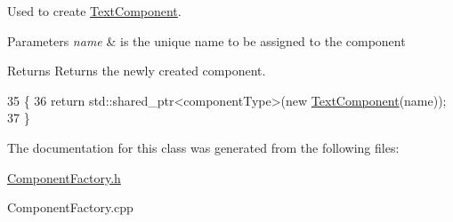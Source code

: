 Used to create \hyperlink{class_text_component}{Text\-Component}. 


\begin{DoxyParams}{Parameters}
{\em name} & is the unique name to be assigned to the component\\
\hline
\end{DoxyParams}
\begin{DoxyReturn}{Returns}
Returns the newly created component. 
\end{DoxyReturn}

\begin{DoxyCode}
35                                                                                  \{
36     \textcolor{keywordflow}{return} std::shared\_ptr<componentType>(\textcolor{keyword}{new} \hyperlink{class_text_component}{TextComponent}(name));
37 \}
\end{DoxyCode}


The documentation for this class was generated from the following files\-:\begin{DoxyCompactItemize}
\item 
\hyperlink{_component_factory_8h}{Component\-Factory.\-h}\item 
Component\-Factory.\-cpp\end{DoxyCompactItemize}

